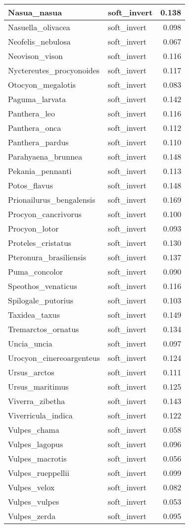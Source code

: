 \begin{table}
\begin{tabular}[t]{l|l|r}
\hline
Nasua\_nasua & soft\_invert & 0.138\\
\hline
Nasuella\_olivacea & soft\_invert & 0.098\\
\hline
Neofelis\_nebulosa & soft\_invert & 0.067\\
\hline
Neovison\_vison & soft\_invert & 0.116\\
\hline
Nyctereutes\_procyonoides & soft\_invert & 0.117\\
\hline
Otocyon\_megalotis & soft\_invert & 0.083\\
\hline
Paguma\_larvata & soft\_invert & 0.142\\
\hline
Panthera\_leo & soft\_invert & 0.116\\
\hline
Panthera\_onca & soft\_invert & 0.112\\
\hline
Panthera\_pardus & soft\_invert & 0.110\\
\hline
Parahyaena\_brunnea & soft\_invert & 0.148\\
\hline
Pekania\_pennanti & soft\_invert & 0.113\\
\hline
Potos\_flavus & soft\_invert & 0.148\\
\hline
Prionailurus\_bengalensis & soft\_invert & 0.169\\
\hline
Procyon\_cancrivorus & soft\_invert & 0.100\\
\hline
Procyon\_lotor & soft\_invert & 0.093\\
\hline
Proteles\_cristatus & soft\_invert & 0.130\\
\hline
Pteronura\_brasiliensis & soft\_invert & 0.137\\
\hline
Puma\_concolor & soft\_invert & 0.090\\
\hline
Speothos\_venaticus & soft\_invert & 0.116\\
\hline
Spilogale\_putorius & soft\_invert & 0.103\\
\hline
Taxidea\_taxus & soft\_invert & 0.149\\
\hline
Tremarctos\_ornatus & soft\_invert & 0.134\\
\hline
Uncia\_uncia & soft\_invert & 0.097\\
\hline
Urocyon\_cinereoargenteus & soft\_invert & 0.124\\
\hline
Ursus\_arctos & soft\_invert & 0.111\\
\hline
Ursus\_maritimus & soft\_invert & 0.125\\
\hline
Viverra\_zibetha & soft\_invert & 0.143\\
\hline
Viverricula\_indica & soft\_invert & 0.122\\
\hline
Vulpes\_chama & soft\_invert & 0.058\\
\hline
Vulpes\_lagopus & soft\_invert & 0.096\\
\hline
Vulpes\_macrotis & soft\_invert & 0.056\\
\hline
Vulpes\_rueppellii & soft\_invert & 0.099\\
\hline
Vulpes\_velox & soft\_invert & 0.082\\
\hline
Vulpes\_vulpes & soft\_invert & 0.053\\
\hline
Vulpes\_zerda & soft\_invert & 0.095\\
\hline
\end{tabular}
\end{table}
